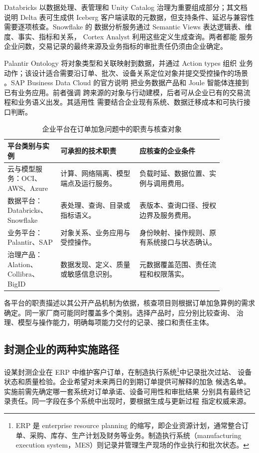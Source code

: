 Databricks 以数据处理、表管理和 Unity Catalog 治理为重要组成部分；其文档
说明 Delta 表可生成供 Iceberg 客户端读取的元数据，但支持条件、延迟与兼容性
需要逐项核查\cite{databricksUnity2026,databricksIceberg2026}。Snowflake 的
数据分析服务通过 Semantic Views 表达逻辑表、维度、事实、指标和关系，
Cortex Analyst 利用这些定义生成查询\cite{snowflakeSemantic2026}。两者都能
服务企业问数，交易记录的最终来源及业务指标的审批责任仍须由企业确定。

Palantir Ontology 将对象类型和关联映射到数据，并通过 Action types 组织
业务动作；该设计适合需要沿订单、批次、设备关系定位对象并提交受控操作的场景
\cite{palantir02,palantirActions2026}。SAP Business Data Cloud 的官方说明
把业务数据产品和 Joule 智能体连接到已有业务应用\cite{sapBDC2026}。前者强调
跨来源的对象与行动建模，后者可从企业已有的交易流程和业务语义出发。其适用性
需要结合企业现有系统、数据迁移成本和可执行接口判断。

\begin{table}[htbp]
\centering\small
\caption{企业平台在订单加急问题中的职责与核查对象}
\begin{tabular}{P{0.20\linewidth}P{0.32\linewidth}P{0.34\linewidth}}
\toprule
{}
平台类别与实例 & 可承担的技术职责 & 应核查的企业条件\\
\midrule
云与模型服务：OCI、AWS、Azure & 计算、网络隔离、模型端点及运行服务。 & 负载时延、数据位置、实例与调用费用。\\
数据平台：Databricks、Snowflake & 表处理、查询、目录或指标语义。 & 表版本、查询口径、授权边界及服务费用。\\
业务平台：Palantir、SAP & 对象关系、业务应用与受控操作。 & 身份映射、操作规则、原有系统接口与状态确认。\\
治理产品：Alation、Collibra、BigID & 数据发现、定义、质量或敏感信息识别。 & 元数据覆盖范围、责任流程和权限落实。\\
\bottomrule
\end{tabular}
\end{table}

各平台的职责描述以其公开产品机制为依据，核查项目则根据订单加急算例的需求确定。同一家厂商可能同时覆盖多个类别。选择产品时，应分别比较查询、
治理、模型与操作能力，明确每项能力交付的记录、接口和责任主体。

\subsection{封测企业的两种实施路径}
设某封测企业在 ERP 中维护客户订单，在制造执行系统\footnote{ERP 是 enterprise resource planning 的缩写，即企业资源计划，通常整合订单、采购、库存、生产计划及财务等业务。制造执行系统（manufacturing execution system，MES）则记录并管理生产现场的作业执行和批次状态。}中记录批次过站、
设备状态和质量检验。企业希望对未来两日的到期订单提供可解释的加急
候选名单。实施前需先确定哪一套系统对订单承诺、设备可用性和审批结果
分别具有最终记录责任。同一字段在多个系统中出现时，要根据生成与更新过程
指定权威来源。

